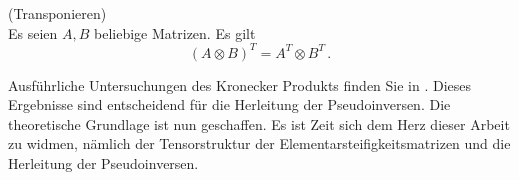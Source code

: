 \begin{Lemma} (Transponieren) \label{lemma:transpose} \\
Es seien $A,B$ beliebige Matrizen. Es gilt
\begin{equation*}
(A \otimes B)^T=A^T \otimes B^T \, .
\end{equation*}
\end{Lemma}

Ausführliche Untersuchungen des Kronecker Produkts finden Sie in \cite{Kronecker}.
Dieses Ergebnisse sind entscheidend für die Herleitung der Pseudoinversen. Die theoretische Grundlage ist nun geschaffen. Es ist Zeit sich dem Herz dieser Arbeit zu widmen, nämlich der Tensorstruktur der Elementarsteifigkeitsmatrizen und die Herleitung der Pseudoinversen.

